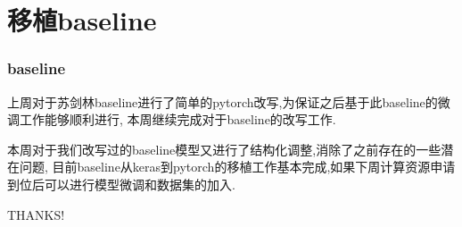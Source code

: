 \documentclass{beamer}
\begin{document}
\section{移植baseline}
\begin{frame}
    \frametitle{baseline}
    上周对于苏剑林baseline进行了简单的pytorch改写,为保证之后基于此baseline的微调工作能够顺利进行,
    本周继续完成对于baseline的改写工作.

    本周对于我们改写过的baseline模型又进行了结构化调整,消除了之前存在的一些潜在问题,
    目前baseline从keras到pytorch的移植工作基本完成,如果下周计算资源申请到位后可以进行模型微调和数据集的加入.

\end{frame}



\begin{frame}
    THANKS!


\end{frame}


%     
%     

\end{document}
